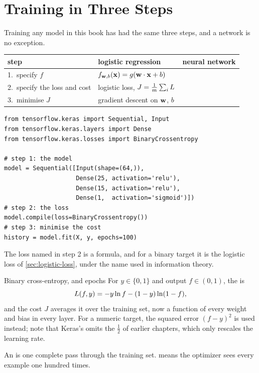 \section{Training in Three Steps}
\label{sec:train-steps}

Training any model in this book has had the same three steps, and a network is
no exception.

\begin{center}
\small
\renewcommand{\arraystretch}{1.35}
\begin{tabular}{@{}L{2.6cm}L{4.3cm}L{4.3cm}@{}}
\toprule
step & logistic regression & neural network\\
.\ specify $f$ & $f_{\mathbf{w},b}(\mathbf{x}) = g(\mathbf{w}\cdot\mathbf{x} + b)$
   & \\
2.\ specify the loss and cost & logistic loss, $J = \frac1m\sum_iL$
   & \\
3.\ minimise $J$ & gradient descent on $\mathbf{w}$, $b$ & \\
\bottomrule
\end{tabular}
\end{center}

\begin{lstlisting}[style=tfkeras, caption={Training a network: one statement per step.}, label={lst:three-steps}]
from tensorflow.keras import Sequential, Input
from tensorflow.keras.layers import Dense
from tensorflow.keras.losses import BinaryCrossentropy

# step 1: the model
model = Sequential([Input(shape=(64,)),
                    Dense(25, activation='relu'),
                    Dense(15, activation='relu'),
                    Dense(1,  activation='sigmoid')])
# step 2: the loss
model.compile(loss=BinaryCrossentropy())
# step 3: minimise the cost
history = model.fit(X, y, epochs=100)
\end{lstlisting}

The loss named in step 2 is a formula, and for a binary target it is the
logistic loss of \cref{sec:logistic-loss}, under the name used in information
theory.

\begin{defbox}{Binary cross-entropy, and epochs}
For $y \in \{0,1\}$ and output $f \in (0,1)$, the  is
\[
  L(f, y) = -y\ln f - (1-y)\ln(1-f),
\]
and the cost $J$ averages it over the training set, now a function of every
weight and bias in every layer. For a numeric target, the squared error
$(f - y)^2$ is used instead; note that Keras's  omits the
$\frac12$ of earlier chapters, which only rescales the learning rate.

An  is one complete pass through the training set. 
means the optimizer sees every example one hundred times.
\end{defbox}

